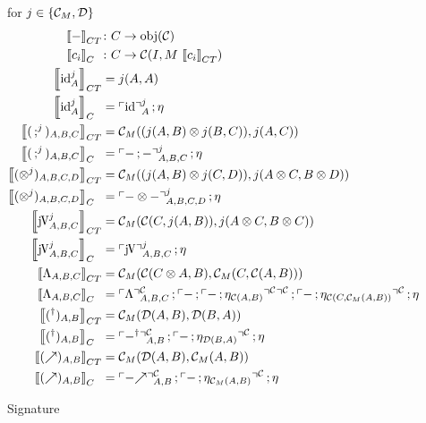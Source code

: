 \documentclass[runningheads,envcountsame]{llncs}
\newcommand{\monad}{M}
\newcommand{\homCM}[3][]{\homJ{#2}{\C_\monad}{#3}}
\begin{document}
\begin{figure}
    \centering
    for $j \in \{\C_\monad, \D\}$
    \begin{align}
        \sem{-}_{CT} &\colon C \to \mathrm{obj}(\C) \\
        \sem{c_i}_{C\phantom{T}} &\colon C \to \C(I, \monad\,\sem{c_i}_{CT}) \\
        \sem{\id[j]_A}_{CT} &= \homJ{A}{j}{A} \\
        \sem{\id[j]_A}_{C\phantom{T}} &= \comp{\name[j]{\id}_A}{\munit} \\
        \sem{(\comp[j]{}{})_{A,B,C}}_{CT} &= \homCM{(\tensor{\homJ{A}{j}{B}}{\homJ{B}{j}{C}})}{\homJ{A}{j}{C}} \\
        \sem{(\comp[j]{}{})_{A,B,C}}_{C\phantom{T}} &= \comp{\name[j]{\comp{-}{-}}_{A,B,C}}{\munit} \\
        \sem{(\tensor[j]{}{})_{A,B,C,D}}_{CT} &= \homCM{(\tensor{\homJ{A}{j}{B}}{\homJ{C}{j}{D}})}{\homJ{\tensor{A}{C}}{j}{\tensor{B}{D}}} \\
        \sem{(\tensor[j]{}{})_{A,B,C,D}}_{C\phantom{T}} &= \comp{\name[j]{\tensor{-}{-}}_{A,B,C,D}}{\munit} \\
        \sem{\juncurry[j]_{A,B,C}}_{CT} &= \homCM{\homC{C}{\homJ{A}{j}{B}}}{\homJ{\tensor{A}{C}}{j}{\tensor{B}{C}}} \\    
        \sem{\juncurry[j]_{A,B,C}}_{C\phantom{T}} &= \comp{\name[j]{\juncurry}_{A,B,C}}{\munit} \\
        \sem{\curry_{A,B,C}}_{CT} &= \homCM{\homC{\tensor{C}{A}}{B}}{\homCM{C}{\homC{A}{B}}} \\
        \sem{\curry_{A,B,C}}_{C\phantom{T}} &= \comp{\comp{\name[\C]{\curry}_{A,B,C}}{\comp{\name[\C]{\comp{-}{\name[\C]{\comp{-}{\munit_{\homC{A}{B}}}}}}}{\name[\C]{\comp{-}{\munit_{\homC{C}{\homCM{A}{B}}}}}}}}{\munit} \\
        \sem{(\rev{})_{A,B}}_{CT} &= \homCM{\homD{A}{B}}{\homD{B}{A}} \\
        \sem{(\rev{})_{A,B}}_{C\phantom{T}} &= \comp{\comp{\name[\C]{\rev{-}}_{A,B}}{\name[\C]{\comp{-}{\munit_{\homD{B}{A}}}}}}{\munit} \\
        \sem{(\f{})_{A,B}}_{CT} &= \homCM{\homD{A}{B}}{\homCM{A}{B}} \\
        \sem{(\f{})_{A,B}}_{C\phantom{T}} &= \comp{\comp{\name[\C]{\f{-}}_{A,B}}{\name[\C]{\comp{-}{\munit_{\homCM{A}{B}}}}}}{\munit}
    \end{align} 
    \caption{Signature}
    \label{fig:signature}
\end{figure}
\end{document}
